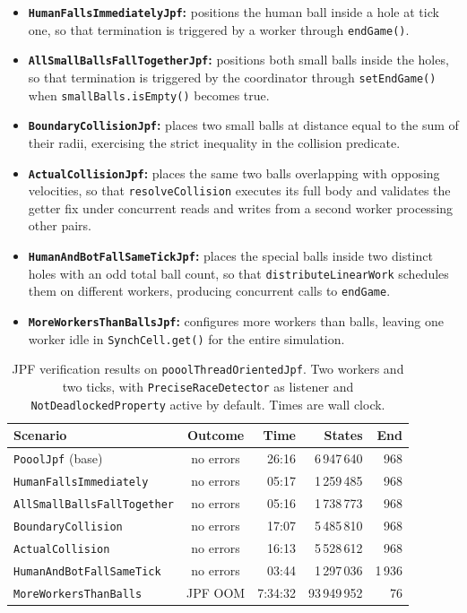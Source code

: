 \documentclass{scrartcl}
\begin{document}
\begin{itemize}
    \item \textbf{\texttt{HumanFallsImmediatelyJpf}:} positions the human ball inside a hole at tick one, so that termination is triggered by a worker through \texttt{endGame()}.
    \item \textbf{\texttt{AllSmallBallsFallTogetherJpf}:} positions both small balls inside the holes, so that termination is triggered by the coordinator through \texttt{setEndGame()} when \texttt{smallBalls.isEmpty()} becomes true.
    \item \textbf{\texttt{BoundaryCollisionJpf}:} places two small balls at distance equal to the sum of their radii, exercising the strict inequality in the collision predicate.
    \item \textbf{\texttt{ActualCollisionJpf}:} places the same two balls overlapping with opposing velocities, so that \texttt{resolveCollision} executes its full body and validates the getter fix under concurrent reads and writes from a second worker processing other pairs.
    \item \textbf{\texttt{HumanAndBotFallSameTickJpf}:} places the special balls inside two distinct holes with an odd total ball count, so that \texttt{distributeLinearWork} schedules them on different workers, producing concurrent calls to \texttt{endGame}.
    \item \textbf{\texttt{MoreWorkersThanBallsJpf}:} configures more workers than balls, leaving one worker idle in \texttt{SynchCell.get()} for the entire simulation.
\end{itemize}

\begin{table}[H]
    \centering
    \begin{tabular}{@{}lcrrr@{}}
        \toprule
        \textbf{Scenario} & \textbf{Outcome} & \textbf{Time} & \textbf{States} & \textbf{End} \\ \midrule
        \texttt{PooolJpf} (base)           & no errors    & 26:16   & 6\,947\,640 & 968 \\
        \texttt{HumanFallsImmediately}     & no errors    & 05:17   & 1\,259\,485 & 968 \\
        \texttt{AllSmallBallsFallTogether} & no errors    & 05:16   & 1\,738\,773 & 968 \\
        \texttt{BoundaryCollision}         & no errors    & 17:07   & 5\,485\,810 & 968 \\
        \texttt{ActualCollision}           & no errors    & 16:13   & 5\,528\,612 & 968 \\
        \texttt{HumanAndBotFallSameTick}   & no errors    & 03:44   & 1\,297\,036 & 1\,936 \\
        \texttt{MoreWorkersThanBalls}      & JPF OOM      & 7:34:32 & 93\,949\,952 & 76 \\
        \bottomrule
    \end{tabular}
    \caption{JPF verification results on \texttt{pooolThreadOrientedJpf}. Two workers and two ticks, with \texttt{PreciseRaceDetector} as listener and \texttt{NotDeadlockedProperty} active by default. Times are wall clock.}
    \label{tab:jpf_results}
\end{table}
\end{document}
